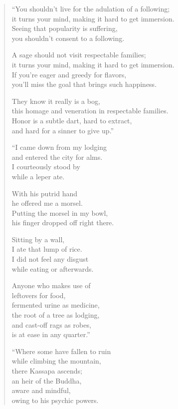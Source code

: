 \documentclass[12pt,openany]{book}%
\begin{document}
\begin{verse}%
“You shouldn’t live for the adulation of a following; \\
it turns your mind, making it hard to get immersion. \\
Seeing that popularity is suffering, \\
you shouldn’t consent to a following. 

A sage should not visit respectable families; \\
it turns your mind, making it hard to get immersion. \\
If you’re eager and greedy for flavors, \\
you’ll miss the goal that brings such happiness. 

They know it really is a bog, \\
this homage and veneration in respectable families. \\
Honor is a subtle dart, hard to extract, \\
and hard for a sinner to give up.” 

“I came down from my lodging \\
and entered the city for alms. \\
I courteously stood by \\
while a leper ate. 

With his putrid hand \\
he offered me a morsel. \\
Putting the morsel in my bowl, \\
his finger dropped off right there. 

Sitting by a wall, \\
I ate that lump of rice. \\
I did not feel any disgust \\
while eating or afterwards. 

Anyone who makes use of \\
leftovers for food, \\
fermented urine as medicine, \\
the root of a tree as lodging, \\
and cast-off rags as robes, \\
is at ease in any quarter.” 

“Where some have fallen to ruin \\
while climbing the mountain, \\
there Kassapa ascends; \\
an heir of the Buddha, \\
aware and mindful, \\
owing to his psychic powers. 


\end{verse}
\end{document}
